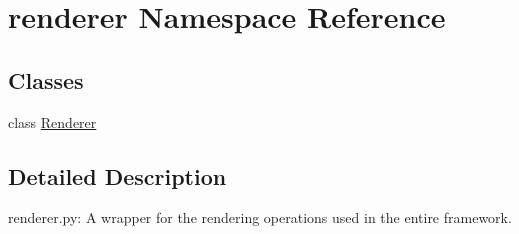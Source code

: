 \hypertarget{namespacerenderer}{}\section{renderer Namespace Reference}
\label{namespacerenderer}
\subsection*{Classes}
\begin{DoxyCompactItemize}
\item 
class \hyperlink{classrenderer_1_1Renderer}{Renderer}
\end{DoxyCompactItemize}


\subsection{Detailed Description}
\begin{DoxyVerb}renderer.py:
A wrapper for the rendering operations used in the entire framework.
\end{DoxyVerb}
 